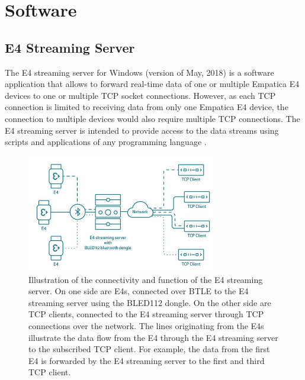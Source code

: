 \newpage
\section{Software}
\subsection{E4 Streaming Server}
The E4 streaming server for Windows (version of May, 2018) is a software application that allows to forward real-time data of one or multiple Empatica E4 devices to one or multiple TCP socket connections. However, as each TCP connection is limited to receiving data from only one Empatica E4 device, the connection to multiple devices would also require multiple TCP connections. The E4 streaming server is intended to provide access to the data streams using scripts and applications of any programming language \cite{E4SS}.

\begin{figure}[h!]
	\centering
  \includegraphics[width=0.75\textwidth]{images/E4streamingServer.JPG}
	\caption[E4 streaming server: connectivity and function]{Illustration of the connectivity and function of the E4 streaming server. On one side are E4s, connected over BTLE to the E4 streaming server using the BLED112 dongle. On the other side are TCP clients, connected to the E4 streaming server through TCP connections over the network. The lines originating from the E4s illustrate the data flow from the E4 through the E4 streaming server to the subscribed TCP client. For example, the data from the first E4 is forwarded by the E4 streaming server to the first and third TCP client. \cite{E4SS}}
	\label{e4ss}
\end{figure}

\newpage
